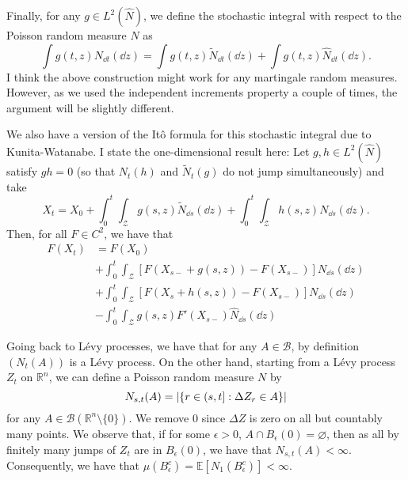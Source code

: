 \documentclass[]{article}
\theoremstyle{definition}
\theoremstyle{definition}
\begin{document}
Finally, for any \(g \in L^2(\hat N)\), we define the stochastic integral with respect to the Poisson 
random measure \(N\) as 
\[\int g(t, z) N_{\dd t}(\dd z) = \int g(t, z) \tilde N_{\dd t}(\dd z) + \int g(t, z) \hat N_{\dd t}(\dd z).\]
I think the above construction might work for any martingale random measures. However, as we used the 
independent increments property a couple of times, the argument will be slightly different.

We also have a version of the It\^o formula for this stochastic integral due to Kunita-Watanabe. I state 
the one-dimensional result here:
Let \(g, h \in L^2(\hat N)\) satisfy \(gh = 0\) (so that \(N_t(h)\) and \(\tilde N_t(g)\) do not jump 
simultaneously) and take
\[X_t = X_0 + \int_0^t \int_\mathcal{Z} g(s, z) \tilde N_{\dd s}(\dd z) + 
    \int_0^t \int_\mathcal{Z} h(s, z) N_{\dd s}(\dd z).\]
Then, for all \(F \in C^2\), we have that  
\begin{align*}
  F(X_t) & = F(X_0)\\ 
  & + \int_0^t \int_\mathcal{Z} \left[F(X_{s-} + g(s, z)) - F(X_{s-})\right] N_{\dd s}(\dd z)\\
  & + \int_0^t \int_\mathcal{Z} \left[F(X_{s} + h(s, z)) - F(X_{s-})\right] N_{\dd s}(\dd z)\\
  & - \int_0^t \int_\mathcal{Z} g(s, z) F'(X_{s-}) \hat N_{\dd s}(\dd z)
\end{align*}

Going back to L\'evy processes, we have that for any \(A \in \mathcal{B}\), by definition \((N_t(A))\) 
is a L\'evy process. On the other hand, starting from a L\'evy process \(Z_t\) on \(\mathbb{R}^n\), 
we can define a Poisson random measure \(N\) by 
\[N_{s, t}(A) = \abs{\{r \in (s, t] : \Delta Z_r \in A\}}\]
for any \(A \in \mathcal{B}(\mathbb{R}^n \setminus \{0\})\). We remove \(0\) since \(\Delta Z\) is zero on 
all but countably many points. We observe that, if for some \(\epsilon > 0\), 
\(A \cap B_\epsilon(0) = \varnothing\), then as all by finitely many jumps of \(Z_t\) are in \(B_\epsilon(0)\), 
we have that \(N_{s, t}(A) < \infty\). Consequently, we have that \(\mu(B_\epsilon^c) = \mathbb{E}[N_1(B_\epsilon^c)] < \infty\).
\end{document}
